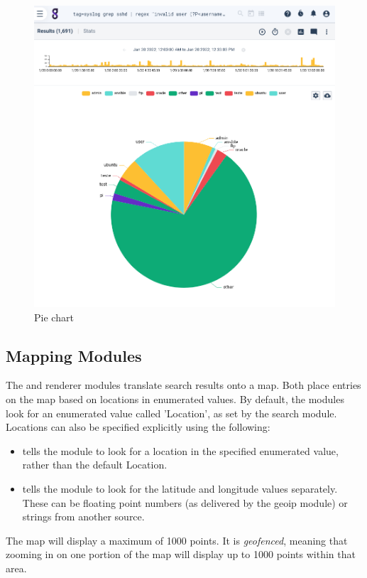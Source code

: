 \begin{figure}
	\includegraphics[width=0.6\linewidth]{images/chart-pie.png}
	\caption{Pie chart}
	\label{fig:chart-pie}
\end{figure}

\clearpage

\subsection{Mapping Modules}
The  and  renderer modules translate search results onto
a map. Both place entries on the map based on locations in enumerated
values. By default, the modules look for an enumerated value called
'Location', as set by the  search module. Locations can also be
specified explicitly using the following:

\begin{itemize}
\item
   tells the module to
  look for a location in the specified enumerated value, rather than the
  default Location.
\item
   tells the module to look
  for the latitude and longitude values separately. These can be
  floating point numbers (as delivered by the geoip module) or strings
  from another source.
\end{itemize}

The map will display a maximum of 1000 points. It is \emph{geofenced}, meaning
that zooming in on one portion of the map will display up to 1000 points
within that area.


